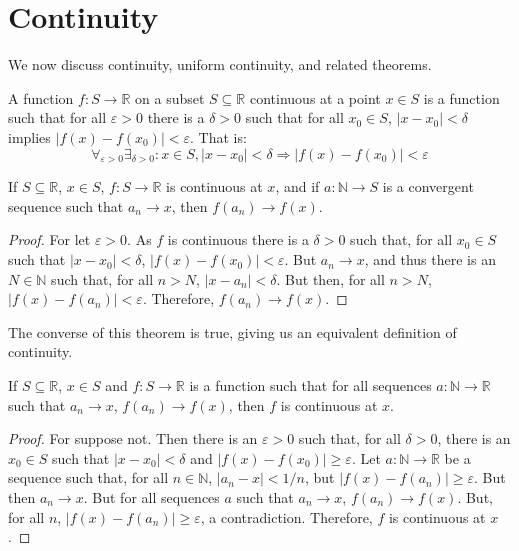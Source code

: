 \section{Continuity}
    We now discuss continuity, uniform continuity, and related theorems.
    \begin{definition}
        A function $f:S\rightarrow\mathbb{R}$ on a subset
        $S\subseteq\mathbb{R}$ continuous at a point $x\in{S}$ is a function
        such that for all $\varepsilon>0$ there is a $\delta>0$ such that for
        all $x_{0}\in{S}$, $|x-x_{0}|<\delta$ implies
        $|f(x)-f(x_{0})|<\varepsilon$. That is:
        \begin{equation}
            \forall_{\varepsilon>0}\exists_{\delta>0}:
            x\in{S},|x-x_{0}|<\delta
            \Rightarrow|f(x)-f(x_{0})|<\varepsilon
        \end{equation}
    \end{definition}
    \begin{theorem}
        If $S\subseteq\mathbb{R}$, $x\in{S}$, $f:S\rightarrow\mathbb{R}$ is
        continuous at $x$, and if $a:\mathbb{N}\rightarrow{S}$ is a convergent
        sequence such that $a_{n}\rightarrow{x}$, then
        $f(a_{n})\rightarrow{f(x)}$.
    \end{theorem}
    \begin{proof}
        For let $\varepsilon>0$. As $f$ is continuous there is a $\delta>0$
        such that, for all $x_{0}\in{S}$ such that $|x-x_{0}|<\delta$,
        $|f(x)-f(x_{0})|<\varepsilon$. But $a_{n}\rightarrow{x}$, and thus
        there is an $N\in\mathbb{N}$ such that, for all $n>N$,
        $|x-a_{n}|<\delta$. But then, for all $n>N$,
        $|f(x)-f(a_{n})|<\varepsilon$. Therefore, $f(a_{n})\rightarrow{f(x)}$.
    \end{proof}
    The converse of this theorem is true, giving us
    an equivalent definition of continuity.
    \begin{theorem}
        If $S\subseteq\mathbb{R}$, $x\in{S}$ and $f:S\rightarrow\mathbb{R}$
        is a function such that for all sequences
        $a:\mathbb{N}\rightarrow\mathbb{R}$ such that $a_{n}\rightarrow{x}$,
        $f(a_{n})\rightarrow{f(x)}$, then $f$ is continuous at $x$.
    \end{theorem}
    \begin{proof}
        For suppose not. Then there is an $\varepsilon>0$ such that, for all
        $\delta>0$, there is an $x_{0}\in{S}$ such that $|x-x_{0}|<\delta$ and
        $|f(x)-f(x_{0})|\geq\varepsilon$. 
        Let $a:\mathbb{N}\rightarrow\mathbb{R}$ be a sequence such that, for
        all $n\in\mathbb{N}$, $|a_{n}-x|<1/n$, but
        $|f(x)-f(a_{n})|\geq\varepsilon$. But then $a_{n}\rightarrow{x}$. But
        for all sequences $a$ such that $a_{n}\rightarrow{x}$,
        $f(a_{n})\rightarrow{f(x)}$. But, for all $n$,
        $|f(x)-f(a_{n})|\geq\varepsilon$, a contradiction.
        Therefore, $f$ is continuous at $x$.
    \end{proof}

